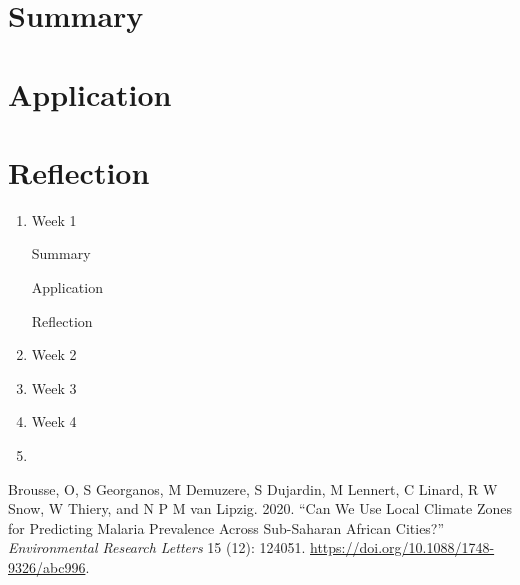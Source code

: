\documentclass[
  letterpaper,
  DIV=11,
  numbers=noendperiod]{scrreprt}
\newlength{\cslhangindent}
\newlength{\cslentryspacingunit} %
\newenvironment{CSLReferences}[2] %
 {%
  \setlength{\parindent}{0pt}
  \ifodd #1
  \let\oldpar\par
  \def\par{\hangindent=\cslhangindent\oldpar}
  \fi
  \setlength{\parskip}{#2\cslentryspacingunit}
 }%
 {}
\begin{document}
\hypertarget{summary-2}{%
\section{Summary}\label{summary-2}}

\hypertarget{application-2}{%
\section{Application}\label{application-2}}

\hypertarget{reflection-2}{%
\section{Reflection}\label{reflection-2}}

\begin{enumerate}
\def\labelenumi{\arabic{enumi}.}
\item
  Week 1

  Summary

  Application

  Reflection
\item
  Week 2
\item
  Week 3
\item
  Week 4
\item
\end{enumerate}

\hypertarget{refs}{}
\begin{CSLReferences}{1}{0}
\leavevmode{}%
Brousse, O, S Georganos, M Demuzere, S Dujardin, M Lennert, C Linard, R
W Snow, W Thiery, and N P M van Lipzig. 2020. {``Can We Use Local
Climate Zones for Predicting Malaria Prevalence Across Sub-Saharan
African Cities?''} \emph{Environmental Research Letters} 15 (12):
124051. \url{https://doi.org/10.1088/1748-9326/abc996}.

\end{CSLReferences}
\end{document}
